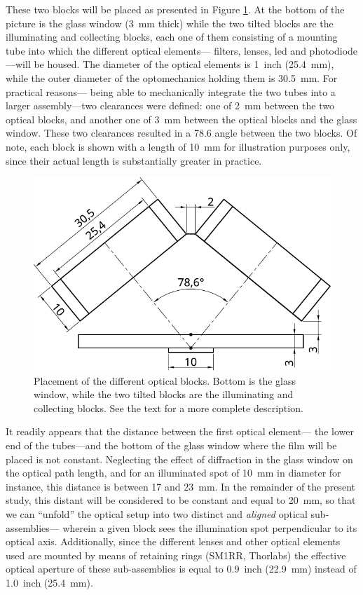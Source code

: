 These two blocks will be placed as presented in Figure \ref{anfig:optics:meca_place}. At the bottom of the picture is the glass window (3~mm thick) while the two tilted blocks are the illuminating and collecting blocks, each one of them consisting of a mounting tube into which the different optical elements---\ie{} filters, lenses, \gls{led} and photodiode---will be housed. The diameter of the optical elements is 1~inch (25.4~mm), while the outer diameter of the optomechanics holding them is 30.5~mm. For practical reasons---\ie{} being able to mechanically integrate the two tubes into a larger assembly---two clearances were defined: one of 2~mm between the two optical blocks, and another one of 3~mm between the optical blocks and the glass window. These two clearances resulted in a 78.6{\degree} angle between the two blocks. Of note, each block is shown with a length of 10~mm for illustration purposes only, since their actual length is substantially greater in practice.

\begin{figure}
	\centering
	\includegraphics[scale=0.8]{2_appendices/optical_figures/meca_drawing.pdf}
	\caption[Placement of the different optical blocks.]{Placement of the different optical blocks. Bottom is the glass window, while the two tilted blocks are the illuminating and collecting blocks. See the text for a more complete description.}
	\label{anfig:optics:meca_place}
\end{figure}

It readily appears that the distance between the first optical element---\ie{} the lower end of the tubes---and the bottom of the glass window where the film will be placed is not constant. Neglecting the effect of diffraction in the glass window on the optical path length, and for an illuminated spot of 10~mm in diameter for instance, this distance is between 17 and 23~mm. In the remainder of the present study, this distant will be considered to be constant and equal to 20~mm, so that we can \enquote{unfold} the optical setup into two distinct and \emph{aligned} optical sub-assemblies---\ie{} wherein a given block sees the illumination spot perpendicular to its optical axis. Additionally, since the different lenses and other optical elements used are mounted by means of retaining rings (SM1RR, Thorlabs) the effective optical aperture of these sub-assemblies is equal to 0.9~inch (22.9~mm) instead of 1.0~inch (25.4~mm).

